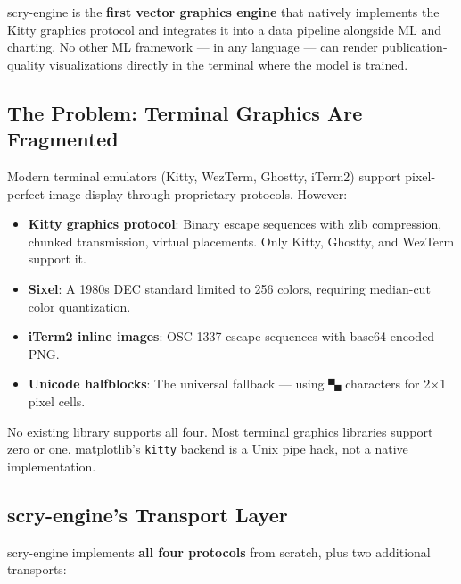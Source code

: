 \documentclass[11pt,a4paper]{article}
\begin{document}
\begin{novelty}
scry-engine is the \textbf{first vector graphics engine} that natively
implements the Kitty graphics protocol and integrates it into a data
pipeline alongside ML and charting. No other ML framework --- in any
language --- can render publication-quality visualizations directly in the
terminal where the model is trained.
\end{novelty}

\subsection{The Problem: Terminal Graphics Are Fragmented}

Modern terminal emulators (Kitty, WezTerm, Ghostty, iTerm2) support
pixel-perfect image display through proprietary protocols. However:

\begin{itemize}[nosep]
    \item \textbf{Kitty graphics protocol}: Binary escape sequences with
          zlib compression, chunked transmission, virtual placements.
          Only Kitty, Ghostty, and WezTerm support it.
    \item \textbf{Sixel}: A 1980s DEC standard limited to 256 colors,
          requiring median-cut color quantization.
    \item \textbf{iTerm2 inline images}: OSC 1337 escape sequences with
          base64-encoded PNG.
    \item \textbf{Unicode halfblocks}: The universal fallback --- using
          \texttt{▀▄} characters for 2$\times$1 pixel cells.
\end{itemize}

No existing library supports all four. Most terminal graphics libraries
support zero or one. matplotlib's \texttt{kitty} backend is a Unix pipe
hack, not a native implementation.

\subsection{scry-engine's Transport Layer}

scry-engine implements \textbf{all four protocols} from scratch, plus
two additional transports:
\end{document}

